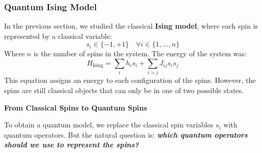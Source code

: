 \subsubsection{Quantum Ising Model}\label{sec:quantum-ising-model}

In the previous section, we studied the classical \textbf{Ising model}, where each spin is represented by a classical variable:
\begin{equation*}
    s_i \in \{-1, +1\} \quad \forall i \in \{1, \dots, n\}
\end{equation*}
Where $n$ is the number of spins in the system. The energy of the system was:
\begin{equation*}
    H_{\text{Ising}} = \sum_i h_i s_i + \sum_{i > j} J_{ij} s_i s_j
\end{equation*}
This equation assigns an energy to each configuration of the spins. However, the spins are still classical objects that can only be in one of two possible states.

\highspace
\begin{flushleft}
    \textcolor{Green3}{ \textbf{From Classical Spins to Quantum Spins}}
\end{flushleft}
To obtain a quantum model, we replace the classical spin variables $s_i$ with quantum operators. But the natural question is: \textbf{\emph{which quantum operators should we use to represent the spins?}}

